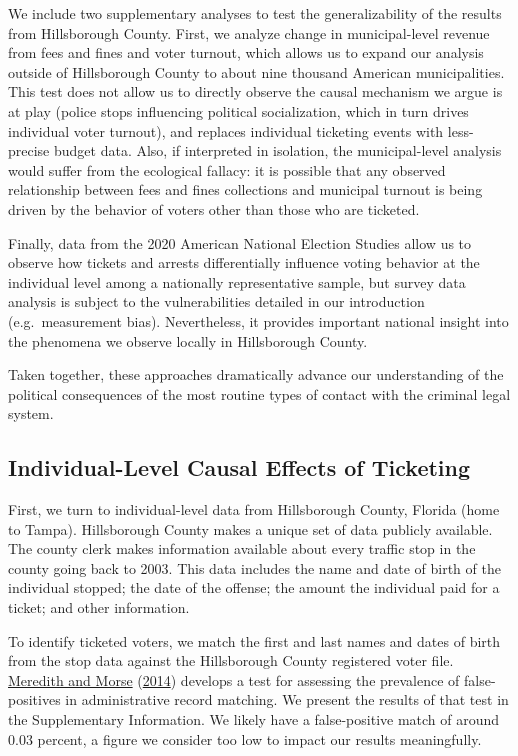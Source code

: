 \documentclass[
  12pt,
]{article}
\begin{document}
We include two supplementary analyses to test the generalizability of the results from Hillsborough County. First, we analyze change in municipal-level revenue from fees and fines and voter turnout, which allows us to expand our analysis outside of Hillsborough County to about nine thousand American municipalities. This test does not allow us to directly observe the causal mechanism we argue is at play (police stops influencing political socialization, which in turn drives individual voter turnout), and replaces individual ticketing events with less-precise budget data. Also, if interpreted in isolation, the municipal-level analysis would suffer from the ecological fallacy: it is possible that any observed relationship between fees and fines collections and municipal turnout is being driven by the behavior of voters other than those who are ticketed.

Finally, data from the 2020 American National Election Studies allow us to observe how tickets and arrests differentially influence voting behavior at the individual level among a nationally representative sample, but survey data analysis is subject to the vulnerabilities detailed in our introduction (e.g.~measurement bias). Nevertheless, it provides important national insight into the phenomena we observe locally in Hillsborough County.

Taken together, these approaches dramatically advance our understanding of the political consequences of the most routine types of contact with the criminal legal system.

\hypertarget{individual-level-causal-effects-of-ticketing}{%
\subsection*{Individual-Level Causal Effects of Ticketing}\label{individual-level-causal-effects-of-ticketing}}

First, we turn to individual-level data from Hillsborough County, Florida (home to Tampa).
Hillsborough County makes a unique set of data publicly available. The county clerk makes information available about every traffic stop in the county going back to 2003. This data includes the name and date of birth of the individual stopped; the date of the offense; the amount the individual paid for a ticket; and other information.

To identify ticketed voters, we match the first and last names and dates of birth from the stop data against the Hillsborough County registered voter file. \protect\hyperlink{ref-Meredith2014}{Meredith and Morse} (\protect\hyperlink{ref-Meredith2014}{2014}) develops a test for assessing the prevalence of false-positives in administrative record matching. We present the results of that test in the Supplementary Information. We likely have a false-positive match of around 0.03 percent, a figure we consider too low to impact our results meaningfully.
\end{document}
